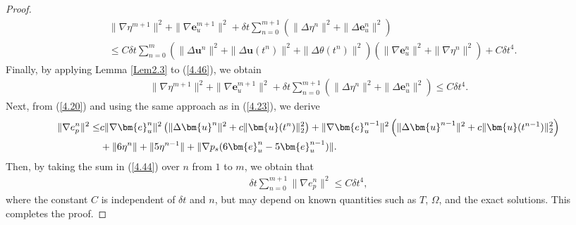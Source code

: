 \documentclass[10pt]{article}
\begin{document}
\begin{proof}
\begin{align}
			&\|\nabla\eta^{m+1}\|^2+\|\nabla\bm{e}_u^{m+1}\|^2+\delta t\sum_{n=0}^{m+1}(\|\Delta \eta^n\|^2+\|\Delta\bm{e}_u^n\|^2)\\
			&\leq C\delta t\sum_{n=0}^{m}(\|\Delta\bm{u}^n\|^2+\|\Delta\bm{u}(t^n)\|^2+\|\Delta\theta(t^n)\|^2)({ \|\nabla\bm{e}_u^n\|^2+\|\nabla\eta^n\|^2})+C\delta t^4.\nonumber
		\end{align}
		Finally, by applying Lemma \ref{Lem2.3} to (\ref{4.46}), we obtain
		\begin{align}
			\|\nabla\eta^{m+1}\|^2+\|\nabla\bm{e}_u^{m+1}\|^2+\delta t\sum_{n=0}^{m+1}(\|\Delta\eta^n\|^2+\|\Delta\bm{e}_u^n\|^2)\leq C\delta t^4.
		\end{align}
		Next, from (\ref{4.20}) and using the same approach as in (\ref{4.23}), we derive
		\begin{align}
			\|\nabla e_p^n\|^2 \leq& c\|\nabla\bm{e}_u^n\|^2\left(\|\Delta\bm{u}^n\|^2 + c\|\bm{u}(t^n)\|_2^2\right) + \|\nabla\bm{e}_u^{n-1}\|^2\left(\|\Delta\bm{u}^{n-1}\|^2 + c\|\bm{u}(t^{n-1})\|_2^2\right)\notag\\
			&+ \|6\eta^n\| + \|5\eta^{n-1}\| + \|\nabla p_s(6\bm{e}_u^n - 5\bm{e}_u^{n-1})\|. \label{4.44}
		\end{align}
		Then, by taking the sum in (\ref{4.44}) over \( n \) from \( 1 \) to \( m \), we obtain that
		\begin{align}
			\delta t\sum_{n=0}^{m+1}\|\nabla e_p^n\|^2 \leq C \delta t^4,
		\end{align}
		where the constant \( C \) is independent of \( \delta t \) and \( n \), but may depend on known quantities such as \( T \), \( \Omega \), and the exact solutions. This completes the proof.
	\end{proof}
\end{document}
